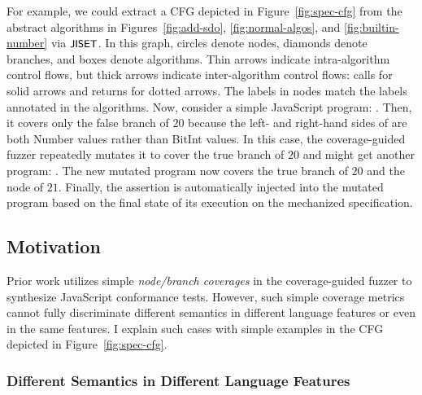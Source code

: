 
For example, we could extract a CFG depicted in Figure~\ref{fig:spec-cfg} from
the abstract algorithms in Figures~\ref{fig:add-sdo}, \ref{fig:normal-algos},
and \ref{fig:builtin-number} via $\textsf{\small JISET}$.
%
In this graph, circles denote nodes, diamonds denote branches, and boxes denote
algorithms.
%
Thin arrows indicate intra-algorithm control flows, but thick arrows indicate
inter-algorithm control flows: calls for solid arrows and returns for dotted
arrows.
%
The labels in nodes match the labels annotated in the algorithms.
%
Now, consider a simple JavaScript program: .
%
Then, it covers only the false branch of $20$ because the left- and right-hand
sides of  are both Number values rather than BitInt values.
%
In this case, the coverage-guided fuzzer repeatedly mutates it to cover the true
branch of $20$ and might get another program: .
%
The new mutated program now covers the true branch of $20$ and the node of $21$.
%
Finally, the assertion  is automatically injected into
the mutated program based on the final state of its execution on the mechanized
specification.




\subsection{Motivation}

Prior work utilizes simple \textit{node/branch coverages} in the coverage-guided
fuzzer to synthesize JavaScript conformance tests.
%
However, such simple coverage metrics cannot fully discriminate different
semantics in different language features or even in the same features.
%
I explain such cases with simple examples in the CFG depicted in
Figure~\ref{fig:spec-cfg}.




\subsubsection{Different Semantics in Different Language Features}

